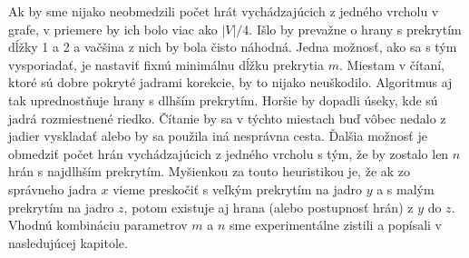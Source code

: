 Ak by sme nijako neobmedzili počet hrát vychádzajúcich z jedného vrcholu v grafe, v priemere by ich bolo viac ako $|V|/4$. Išlo by prevažne o hrany s prekrytím dĺžky 1 a 2 a vačšina z nich by bola čisto náhodná. Jedna možnosť, ako sa s tým vysporiadať, je nastaviť fixnú minimálnu dĺžku prekrytia $m$. Miestam v čítaní, ktoré sú dobre pokryté jadrami korekcie, by to nijako neuškodilo. Algoritmus aj tak uprednostňuje hrany s dlhším prekrytím. Horšie by dopadli úseky, kde sú jadrá rozmiestnené riedko. Čítanie by sa v týchto miestach buď vôbec nedalo z jadier vyskladať alebo by sa použila iná nesprávna cesta. Ďalšia možnosť je obmedziť počet hrán vychádzajúcich z jedného vrcholu s tým, že by zostalo len $n$ hrán s najdlhším prekrytím. Myšienkou za touto heuristikou je, že ak zo správneho jadra $x$ vieme preskočiť s veľkým prekrytím na jadro $y$ a s malým prekrytím na jadro $z$, potom existuje aj hrana (alebo postupnosť hrán) z $y$ do $z$. Vhodnú kombináciu parametrov $m$ a $n$ sme experimentálne zistili a popísali v nasledujúcej kapitole.